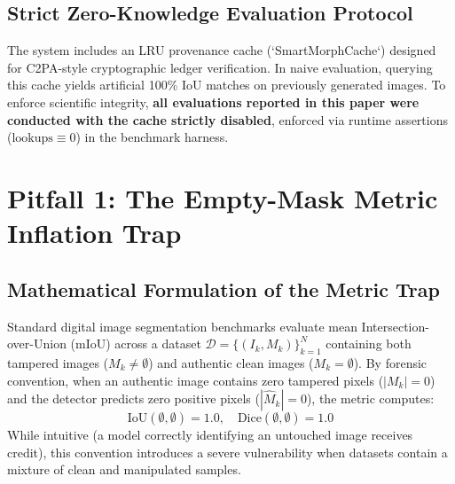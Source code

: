 \documentclass[conference]{IEEEtran}
\begin{document}
\subsection{Strict Zero-Knowledge Evaluation Protocol}
The system includes an LRU provenance cache (`SmartMorphCache`) designed for C2PA-style cryptographic ledger verification. In naive evaluation, querying this cache yields artificial 100\% IoU matches on previously generated images. To enforce scientific integrity, \textbf{all evaluations reported in this paper were conducted with the cache strictly disabled}, enforced via runtime assertions ($\text{lookups} \equiv 0$) in the benchmark harness.

\section{Pitfall 1: The Empty-Mask Metric Inflation Trap}

\subsection{Mathematical Formulation of the Metric Trap}
Standard digital image segmentation benchmarks evaluate mean Intersection-over-Union (mIoU) across a dataset $\mathcal{D} = \{ (I_k, M_k) \}_{k=1}^N$ containing both tampered images ($M_k \neq \emptyset$) and authentic clean images ($M_k = \emptyset$). By forensic convention, when an authentic image contains zero tampered pixels ($|M_k| = 0$) and the detector predicts zero positive pixels ($|\hat{M}_k| = 0$), the metric computes:
\begin{equation}
    \text{IoU}(\emptyset, \emptyset) = 1.0, \quad \text{Dice}(\emptyset, \emptyset) = 1.0
\end{equation}
While intuitive (a model correctly identifying an untouched image receives credit), this convention introduces a severe vulnerability when datasets contain a mixture of clean and manipulated samples.


\end{document}
